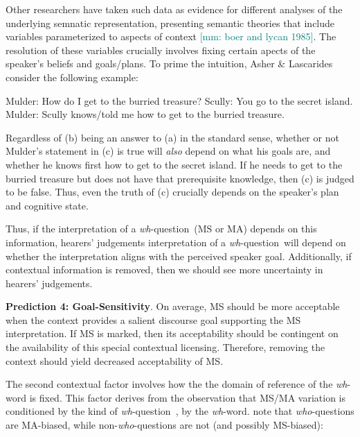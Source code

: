 \documentclass[12pt,letterpaper,table,svgnames,dvipsnames]{article}
\newcommand{\jd}[1]{\textcolor{Purple}{[jd: #1]}}
\newcommand{\mm}[1]{\textcolor{teal}{[mm: #1]}}
\newcommand{\whq}{\emph{wh}-question~}
\begin{document}
Other researchers have taken such data as evidence for different analyses of the underlying semnatic representation, presenting semantic theories that include variables parameterized to aspects of context \cite{boerlycan75,ginzburg1995,asherlascarides1998,lahiri2002,vanrooij2003,vanrooij2004}\mm{boer and lycan 1985}. The resolution of these variables crucially involves fixing certain apects of the speaker's beliefs and goals/plans. To prime the intuition, Asher \& Lascarides consider the following example:
\begin{exe}
    \ex 
    \begin{xlist}
        \ex Mulder: How do I get to the burried treasure?
        \ex Scully: You go to the secret island.
        \ex Mulder: Scully knows/told me how to get to the burried treasure.
    \end{xlist}
\end{exe}
Regardless of (b) being an answer to (a) in the standard sense, whether or not Mulder's statement in (c) is true will \emph{also} depend on what his goals are, and whether he knows first how to get to the secret island. If he needs to get to the burried treasure but does not have that prerequisite knowledge, then (c) is judged to be false. Thus, even the truth of (c) crucially depends on the speaker's plan and cognitive state.

Thus, if the interpretation of a \whq (MS or MA) depends on this information, hearers' judgements interpretation of a \whq will depend on whether the interpretation aligns with the perceived speaker goal. Additionally, if contextual information is removed, then we should see more uncertainty in hearers' judgements.

\begin{tcolorbox}[colback=white]
\noindent \textbf{Prediction 4: Goal-Sensitivity}. On average, MS should be more acceptable when the context provides a salient discourse goal supporting the MS interpretation. If MS is marked, then its acceptability should be contingent on the availability of this special contextual licensing. Therefore, removing the context should yield decreased acceptability of MS.
\end{tcolorbox}

The second contextual factor involves how the the domain of reference of the \emph{wh}-word is fixed. This factor derives from the observation that MS/MA variation is conditioned by the kind of \whq, by the \emph{wh}-word.  note that \emph{who}-questions are MA-biased, while non-\emph{who}-questions are not (and possibly MS-biased): 
\end{document}
